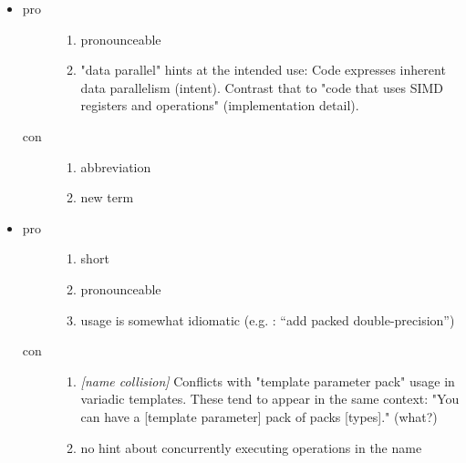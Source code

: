\begin{itemize}
  \item {}
    \begin{description}
      \item[pro]
        \begin{enumerate}
          \item pronounceable
          \item "data parallel" hints at the intended use: Code expresses inherent data parallelism (intent). Contrast that to "code that uses SIMD registers and operations" (implementation detail).
        \end{enumerate}
      \item[con]
        \begin{enumerate}
          \item abbreviation
          \item new term
        \end{enumerate}
    \end{description}

  \item {}
    \begin{description}
      \item[pro]
        \begin{enumerate}
          \item short
          \item pronounceable
          \item usage is somewhat idiomatic (e.g. : “add packed double-precision”)
        \end{enumerate}
      \item[con]
        \begin{enumerate}
          \item \emph{[name collision]} Conflicts with "template parameter pack" usage in variadic templates.
            These tend to appear in the same context: "You can have a [template parameter] pack of packs [types]." (what?)
          \item no hint about concurrently executing operations in the name
        \end{enumerate}
    \end{description}


\end{itemize}
